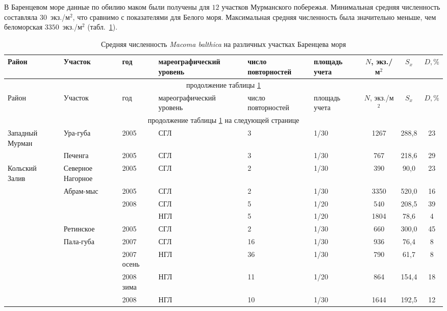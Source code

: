 \documentclass[12pt, a4paper]{disser}
\begin{document}
В Баренцевом море данные по обилию маком были получены для $12$ участков Мурманского побережья.
Минимальная средняя численность составляла $30$~экз./м$^2$, что сравнимо с показателями для Белого моря. 
Максимальная средняя численность была значительно меньше, чем беломорская \textemdash $3350$~экз./м$^2$ (табл.~\ref{tab:mean_N_Barents}). 
	\begin{footnotesize}
	\begin{longtable}{|p{2cm}|p{3cm}|p{1cm}|p{2cm}|p{1.5cm}|p{1cm}|*{3}{c|}}
	\caption{Средняя численность {\it Macoma balthica} на различных участках Баренцева моря}\label{tab:mean_N_Barents}\\
	\hline
	Район & Участок & год & ма\-ре\-ографи\-ческий уровень & число повторностей & площадь учета & $N$, экз./м$^2$ & $S_x$  & $D, \%$ 
	\\ \hline \endfirsthead
	\hline
	\multicolumn{9}{|c|}{продолжение таблицы \ref{tab:mean_N_Barents}} \\ \hline
	Район & Участок & год & ма\-ре\-ографи\-ческий уровень & число повторностей & площадь учета & $N$, экз./м$^2$ & $S_x$  & $D, \%$ 
	\\ \hline \endhead
	\hline 
	\multicolumn{9}{|c|}{продолжение таблицы \ref{tab:mean_N_Barents} на следующей странице}
	\\ \hline \endfoot
	\endlastfoot
	Западный Мурман & Ура-губа & 2005 & СГЛ & 3 & 1/30 & 1267 & 288,8 & 23
		\\ \cline{2-9}
		 & Печенга & 2005 & СГЛ & 3 & 1/30 & 767 & 218,6 & 29
		\\ \hline
	Кольский Залив & Северное Нагорное & 2005 & СГЛ & 2 & 1/30 & 390 & 90,0 & 23
		\\ \cline{2-9}
		 & Абрам-мыс & 2005 & СГЛ & 2 & 1/30 & 3350 & 520,0 & 16
		\\ \cline{3-9}
		 &  & 2008 & СГЛ & 5 & 1/20 & 540 & 208,5 & 39
		\\ \cline{4-9}
		 &  &  & НГЛ & 5 & 1/20 & 1804 & 78,6 & 4
		\\ \cline{2-9}
		 & Ретинское & 2005 & СГЛ & 2 & 1/30 & 660 & 300,0 & 45
		\\ \cline{2-9}
		 & Пала-губа & 2007 & СГЛ & 16 & 1/30 & 936 & 76,4 & 8
		\\ \cline{3-9}
		 &  & 2007 осень & НГЛ & 36 & 1/30 & 790 & 61,7 & 8
		\\ \cline{3-9}
		 &  & 2008 зима & НГЛ & 11 & 1/20 & 864 & 154,4 & 18
		\\ \cline{3-9}
		 &  & 2008 & НГЛ & 10 & 1/30 & 1644 & 192,5 & 12
		\\ \hline

\end{longtable}
\end{footnotesize}
\end{document}
